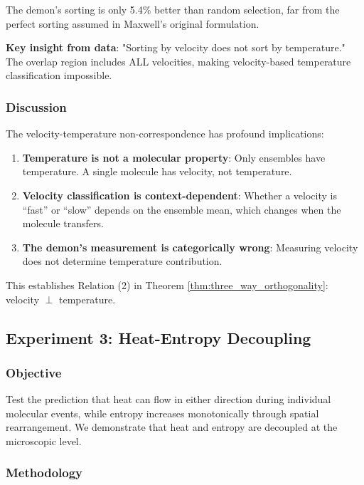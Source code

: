 \documentclass[10pt,twocolumn,letterpaper]{article}
\theoremstyle{definition}
\theoremstyle{remark}
\begin{document}
The demon's sorting is only 5.4\% better than random selection, far from the perfect sorting assumed in Maxwell's original formulation.

\textbf{Key insight from data}: "Sorting by velocity does not sort by temperature." The overlap region includes ALL velocities, making velocity-based temperature classification impossible.

\subsubsection{Discussion}

The velocity-temperature non-correspondence has profound implications:

\begin{enumerate}
\item \textbf{Temperature is not a molecular property}: Only ensembles have temperature. A single molecule has velocity, not temperature.

\item \textbf{Velocity classification is context-dependent}: Whether a velocity is ``fast'' or ``slow'' depends on the ensemble mean, which changes when the molecule transfers.

\item \textbf{The demon's measurement is categorically wrong}: Measuring velocity does not determine temperature contribution.
\end{enumerate}

This establishes Relation (2) in Theorem \ref{thm:three_way_orthogonality}: velocity $\perp$ temperature.

\subsection{Experiment 3: Heat-Entropy Decoupling}

\subsubsection{Objective}

Test the prediction that heat can flow in either direction during individual molecular events, while entropy increases monotonically through spatial rearrangement. We demonstrate that heat and entropy are decoupled at the microscopic level.

\subsubsection{Methodology}
\end{document}
